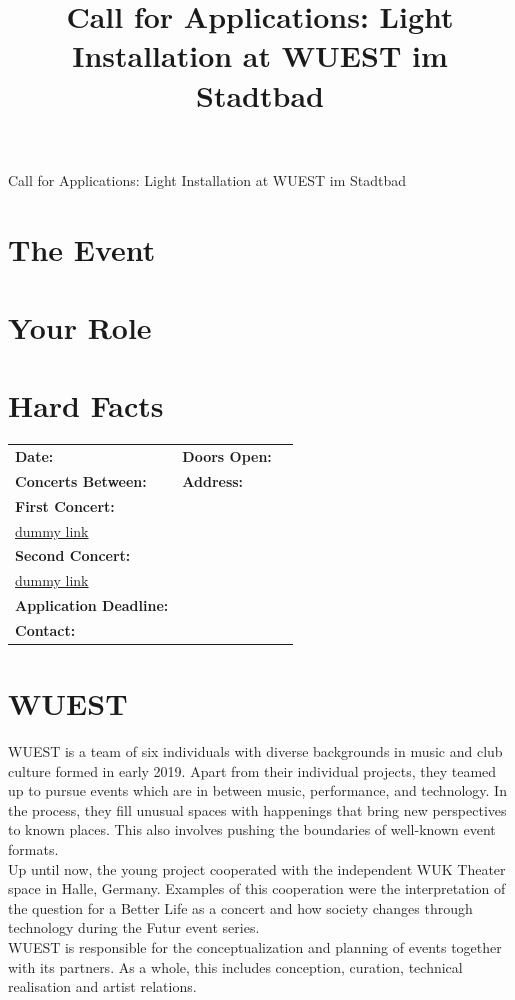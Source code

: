 \documentclass[a4paper, 11pt]{memoir}
\title{Call for Applications: Light Installation at WUEST im Stadtbad}
\date{}
\begin{document}
    \pagestyle{empty}

    \begin{center}
        \Huge{Call for Applications: Light Installation at WUEST im Stadtbad}
    \end{center}

    \section*{The Event}

    \section*{Your Role}

    \section*{Hard Facts}

    \begin{tabularx}{\textwidth}{lXr}

        \textbf{Date:} & \textbf{Doors Open:} \\
        \textbf{Concerts Between:} & \textbf{Address:} \\
        \textbf{First Concert:} \\
        \href{www.duckduckgo.com}{dummy link} \\
        \textbf{Second Concert:} \\
        \href{www.duckduckgo.com}{dummy link} \\
        \textbf{Application Deadline:} \\
        \textbf{Contact:} \\


    \end{tabularx}
    \section*{WUEST}
    WUEST is a team of six individuals with diverse backgrounds in music and club 
    culture formed in early 2019. Apart from their individual projects, they 
    teamed up to pursue events which are in between music, performance, and 
    technology. In the process, they fill unusual spaces with happenings that 
    bring new perspectives to known places. This also involves pushing the boundaries 
    of well-known event formats. \\
    Up until now, the young project cooperated with the independent WUK Theater space 
    in Halle, Germany. Examples of this cooperation were the interpretation of the
    question for a Better Life as a concert and how society changes through 
    technology during the Futur event series. \\
    WUEST is responsible for the conceptualization and planning of events together 
    with its partners. As a whole, this includes conception, curation, technical 
    realisation and artist relations.
\end{document}
